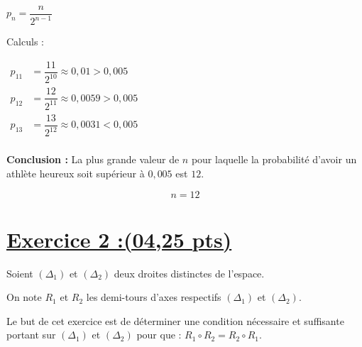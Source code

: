 \documentclass[12pt,a4paper]{article}
\begin{document}
\begin{enumerate}
\begin{enumerate}
    \vspace{0.2cm}
\noindent

\( p_n = \dfrac{n}{2^{n-1}} \)

Calculs :

\(
\begin{aligned}
p_{11} &= \dfrac{11}{2^{10}} \approx 0,01 > 0,005\\
p_{12} &= \dfrac{12}{2^{11}} \approx 0,0059 > 0,005\\
p_{13} &= \dfrac{13}{2^{12}} \approx 0,0031 < 0,005\\
\end{aligned}
\)

\vspace{0.2cm}
\noindent
\textbf{Conclusion :} La plus grande valeur de \( n \) pour laquelle la probabilité d’avoir un athlète heureux soit supérieur à $0,005$
est $12$.

\[
\boxed{n = 12}
\]    
\end{enumerate}
 
\end{enumerate}

\section*{\underline{Exercice 2 :(04,25 pts)}}

Soient \( (\Delta_1) \) et \( (\Delta_2) \) deux droites distinctes de l’espace.

\noindent
On note \( R_1 \) et \( R_2 \) les demi-tours d’axes respectifs \( (\Delta_1) \) et \( (\Delta_2) \).

\medskip
Le but de cet exercice est de déterminer une condition nécessaire et suffisante portant sur \( (\Delta_1) \) et \( (\Delta_2) \) pour que : \( R_1 \circ R_2 = R_2 \circ R_1. \)
\end{document}
